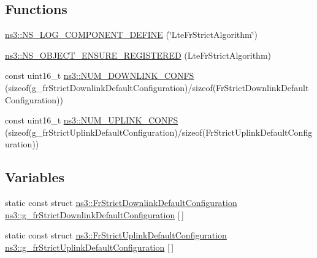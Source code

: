 \subsection*{Functions}
\begin{DoxyCompactItemize}
\item 
\hyperlink{namespacens3_a046d8ab9d62d17bbf60e567c886b9b70}{ns3\+::\+N\+S\+\_\+\+L\+O\+G\+\_\+\+C\+O\+M\+P\+O\+N\+E\+N\+T\+\_\+\+D\+E\+F\+I\+NE} (\char`\"{}Lte\+Fr\+Strict\+Algorithm\char`\"{})
\item 
\hyperlink{namespacens3_a2a410457aa5f42e539c088c9345116af}{ns3\+::\+N\+S\+\_\+\+O\+B\+J\+E\+C\+T\+\_\+\+E\+N\+S\+U\+R\+E\+\_\+\+R\+E\+G\+I\+S\+T\+E\+R\+ED} (Lte\+Fr\+Strict\+Algorithm)
\item 
const uint16\+\_\+t \hyperlink{namespacens3_ad5de0432c3987ef84bc2bb195266e30e}{ns3\+::\+N\+U\+M\+\_\+\+D\+O\+W\+N\+L\+I\+N\+K\+\_\+\+C\+O\+N\+FS} (sizeof(g\+\_\+fr\+Strict\+Downlink\+Default\+Configuration)/sizeof(Fr\+Strict\+Downlink\+Default\+Configuration))
\item 
const uint16\+\_\+t \hyperlink{namespacens3_a4a820e4ef1d8f80a8cfd9723770d0bd5}{ns3\+::\+N\+U\+M\+\_\+\+U\+P\+L\+I\+N\+K\+\_\+\+C\+O\+N\+FS} (sizeof(g\+\_\+fr\+Strict\+Uplink\+Default\+Configuration)/sizeof(Fr\+Strict\+Uplink\+Default\+Configuration))
\end{DoxyCompactItemize}
\subsection*{Variables}
\begin{DoxyCompactItemize}
\item 
static const struct \hyperlink{structns3_1_1FrStrictDownlinkDefaultConfiguration}{ns3\+::\+Fr\+Strict\+Downlink\+Default\+Configuration} \hyperlink{namespacens3_aa3cd214bfa1a6233b8ef40cc9244f8f5}{ns3\+::g\+\_\+fr\+Strict\+Downlink\+Default\+Configuration} \mbox{[}$\,$\mbox{]}
\item 
static const struct \hyperlink{structns3_1_1FrStrictUplinkDefaultConfiguration}{ns3\+::\+Fr\+Strict\+Uplink\+Default\+Configuration} \hyperlink{namespacens3_a8b9239de5f4dfb803502d6841a021253}{ns3\+::g\+\_\+fr\+Strict\+Uplink\+Default\+Configuration} \mbox{[}$\,$\mbox{]}
\end{DoxyCompactItemize}
